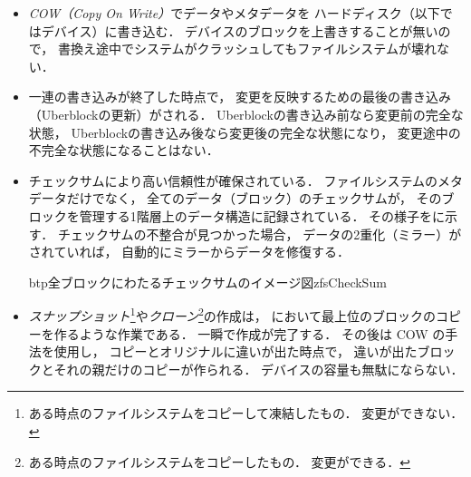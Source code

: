 \begin{itemize}
\item \emph{COW（Copy On Write）}でデータやメタデータを
  ハードディスク（以下ではデバイス）に書き込む．
  デバイスのブロックを上書きすることが無いので，
  書換え途中でシステムがクラッシュしてもファイルシステムが壊れない．
\item 一連の書き込みが終了した時点で，
  変更を反映するための最後の書き込み（Uberblockの更新）がされる．
  Uberblockの書き込み前なら変更前の完全な状態，
  Uberblockの書き込み後なら変更後の完全な状態になり，
  変更途中の不完全な状態になることはない．
\item チェックサムにより高い信頼性が確保されている．
  ファイルシステムのメタデータだけでなく，
  全てのデータ（ブロック）のチェックサムが，
  そのブロックを管理する1階層上のデータ構造に記録されている．
  その様子をに示す．
  チェックサムの不整合が見つかった場合，
  データの2重化（ミラー）がされていれば，
  自動的にミラーからデータを修復する．

  \begin{myfig}{btp}{全ブロックにわたるチェックサムのイメージ図}{zfsCheckSum}
  \end{myfig}

\item \emph{スナップショット}\footnote{
    ある時点のファイルシステムをコピーして凍結したもの．
    変更ができない．
  }や\emph{クローン}\footnote{
    ある時点のファイルシステムをコピーしたもの．
    変更ができる．
  }の作成は，
  において最上位のブロックのコピーを作るような作業である．
  一瞬で作成が完了する．
  その後は COW の手法を使用し，
  コピーとオリジナルに違いが出た時点で，
  違いが出たブロックとそれの親だけのコピーが作られる．
  デバイスの容量も無駄にならない．


\end{itemize}
